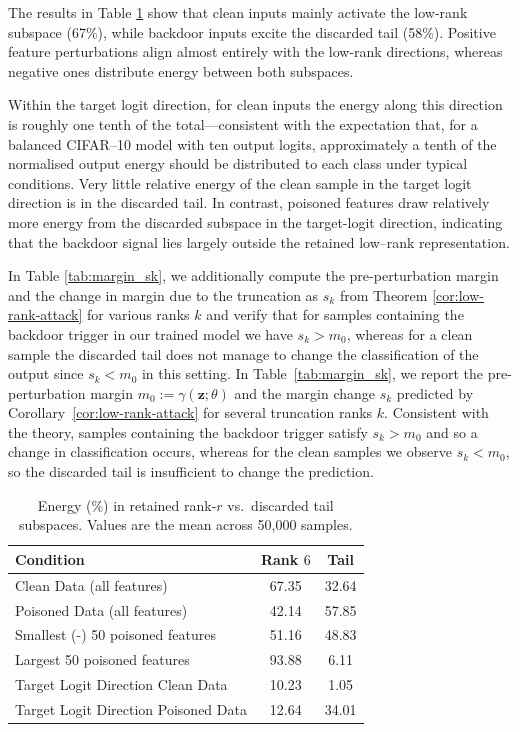 \documentclass{article}
\theoremstyle{plain}
\theoremstyle{definition}
\theoremstyle{remark}
\begin{document}
The results in Table \ref{tab:energy_split_small} show that
clean inputs mainly activate the low-rank subspace (67\%), while backdoor inputs excite the discarded tail (58\%).
Positive feature perturbations align almost entirely with the low-rank directions, whereas negative ones distribute energy between both subspaces.

Within the target logit direction, for clean inputs the energy along this direction is roughly one tenth of the total---consistent with the expectation that, for a balanced CIFAR--10 model with ten output logits, approximately a tenth of the normalised output energy should be distributed to each class under typical conditions. Very little relative energy of the clean sample in the target logit direction is in the discarded tail. In contrast, poisoned features draw relatively more energy from the discarded subspace in the target-logit direction, indicating that the backdoor signal lies largely outside the retained low--rank representation.  

In Table \ref{tab:margin_sk}, we additionally compute the pre-perturbation margin and the change in margin due to the truncation as $s_k$ from Theorem \ref{cor:low-rank-attack} for various ranks $k$  and verify that for samples containing the backdoor trigger in our trained model we have $s_k > m_0$, whereas for a clean sample the discarded tail does not manage to change the classification of the output since $s_k < m_0$ in this setting.
In Table~\ref{tab:margin_sk}, we report the pre-perturbation margin
$m_0:=\gamma(\mathbf z;\theta)$ and the margin change $s_k$ predicted by
Corollary~\ref{cor:low-rank-attack} for several truncation ranks $k$.
Consistent with the theory, samples containing the backdoor trigger satisfy
$s_k>m_0$ and so a change in classification occurs, whereas for the clean samples we observe $s_k<m_0$,
so the discarded tail is insufficient to change the prediction.


\begin{table}[h]
\centering
\setlength{\tabcolsep}{4pt}
\caption{Energy (\%) in retained rank-$r$ vs.\ discarded tail subspaces.
Values are the mean across 50,000 samples.}
\label{tab:energy_split_small}
\begin{tabular}{lcc}
\toprule
\textbf{Condition} & \textbf{Rank $6$} & \textbf{Tail} \\
\midrule
Clean Data (all features)      & 67.35	& 32.64 \\
Poisoned Data (all features)   & 42.14	& 57.85 \\
Smallest (-) 50 poisoned features    & 51.16	& 48.83\\
Largest 50 poisoned features     & 93.88 & 6.11  \\
Target Logit Direction Clean Data & 10.23 &	1.05 \\
Target Logit Direction Poisoned Data & 12.64 &	34.01 \\
\bottomrule 
\end{tabular}
\end{table}
\end{document}
